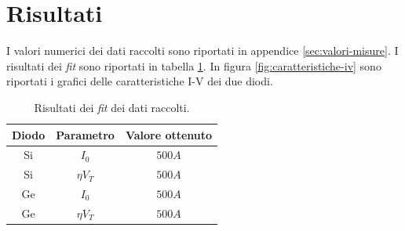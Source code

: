 \documentclass[11pt, a4paper, twoside]{article}
\begin{document}
\section{Risultati}\label{sec:risultati}
  I valori numerici dei dati raccolti sono riportati in appendice \ref{sec:valori-misure}.
  I risultati dei \emph{fit} sono riportati in tabella \ref{tab:risultati-fit}.
  In figura \ref{fig:caratteristiche-iv} sono riportati i grafici delle caratteristiche I-V dei due diodi.
  \begin{table}[H]
    \centering
    \begin{tabular}[t]{ccc}
      \toprule
      Diodo& Parametro &Valore ottenuto\\
      \midrule
      Si & $I_0$ &  $500A$ \\
      Si & $\eta V_T$ &  $500A$ \\
      Ge & $I_0$ &  $500A$ \\
      Ge & $\eta V_T$ &  $500A$ \\
      \bottomrule
      \end{tabular}
    \caption{
      Risultati dei \emph{fit} dei dati raccolti.
    }
    \label{tab:risultati-fit}
  \end{table}
\end{document}
